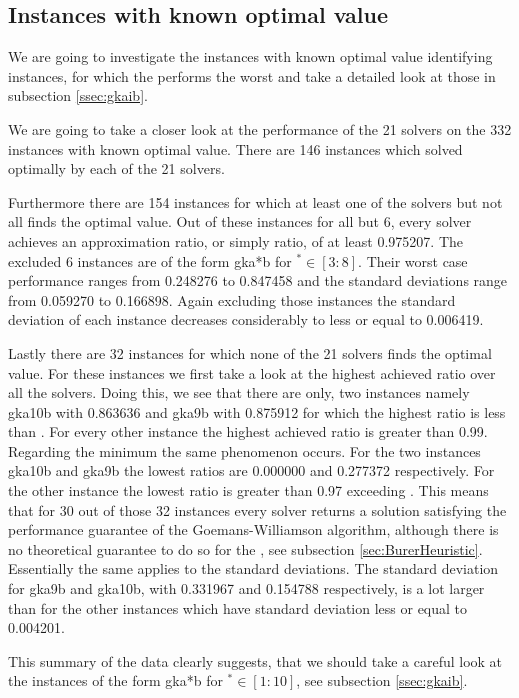 \documentclass[12pt,a4paper]{article}
\theoremstyle{mythm}
\begin{document}
\subsection{Instances with known optimal value} 
\label{ssec:knownOptVal} 
We are going to investigate the instances with known optimal value identifying instances, for which the \BH performs the worst and take a detailed look at those in subsection \ref{ssec:gkaib}.

We are going to take a closer look at the performance of the 21 solvers on the 332 instances with known optimal value.
There are 146 instances which solved optimally by each of the 21 solvers. 

Furthermore there are 154 instances for which at least one of the solvers but not all finds the optimal value.
Out of these instances for all but 6, every solver achieves an approximation ratio, or simply ratio, of at least 0.975207.
The excluded 6 instances are of the form gka*b for $ ^{ * } \in \left[ 3:8 \right]   $. 
Their worst case performance ranges from 0.248276 to 0.847458 and the standard
deviations range from 0.059270 to 0.166898.
Again excluding those instances the standard deviation of each instance decreases considerably to less or equal to 0.006419.

Lastly there are 32 instances for which none of the 21 solvers finds the optimal value.
For these instances we first take a look at the highest achieved ratio over all the solvers.
Doing this, we see that there are only, two instances namely gka10b with 0.863636 and gka9b with 0.875912 for which the highest ratio is less than \GWconst.
For every other instance the highest achieved ratio is greater than 0.99.
Regarding the minimum the same phenomenon occurs.
For the two instances gka10b and gka9b the lowest ratios are 0.000000 and 0.277372 respectively.
For the other instance the lowest ratio is greater than 0.97 exceeding \GWconst.
This means that for 30 out of those 32 instances every solver returns a solution satisfying the performance guarantee of the Goemans-Williamson algorithm, although there is no
theoretical guarantee to do so for the \BH, see subsection \ref{sec:BurerHeuristic}.
Essentially the same applies to the standard deviations.
The standard deviation for gka9b and gka10b, with 0.331967 and 0.154788 respectively, is a lot larger than for the other instances which have standard deviation less or equal
to 0.004201.

This summary of the data clearly suggests, that we should take a careful look at the instances of the form gka*b for $ ^{ * } \in \left[ 1:10 \right]   $, see subsection
\ref{ssec:gkaib}. 
\end{document}
